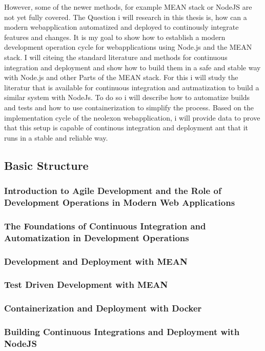 However, some of the newer methods, for example MEAN stack or NodeJS are not yet fully covered.
The Question i will research in this thesis is, how can a modern webapplication automatized and deployed to continously integrate features and
changes. It is my goal to show how to establish a modern development operation cycle for webapplications using Node.js and the MEAN stack.
I will citeing the standard literature and methods for continuous integration and deployment and show how to build them in a safe and stable
way with Node.js and other Parts of the MEAN stack.
For this i will study the literatur that is available for continuous integration and autmatization to build a similar system with NodeJs.
To do so i will describe how to automatize builds and tests and how to use containerization to simplify the process. Based on the
implementation cycle of the neolexon webapplication, i will provide data to prove that this setup is capable of continous integration and deployment
ant that it runs in a stable and reliable way.

\subsection{Basic Structure}
\subsubsection{Introduction to Agile Development and the Role of Development Operations in Modern Web Applications}
\subsubsection{The Foundations of Continuous Integration and Automatization in Development Operations}
\subsubsection{Development and Deployment with MEAN}
\subsubsection{Test Driven Development with MEAN}
\subsubsection{Containerization and Deployment with Docker}
\subsubsection{Building Continuous Integrations and Deployment with NodeJS}

